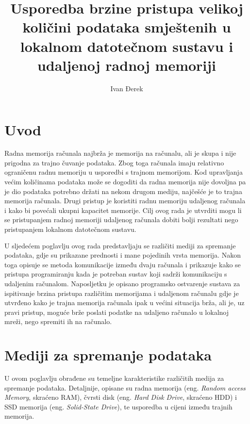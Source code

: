 \documentclass[times, utf8, zavrsni, square]{fer}
\begin{document}

\title{Usporedba brzine pristupa velikoj količini podataka smještenih u lokalnom datotečnom sustavu i udaljenoj radnoj memoriji}

\author{Ivan Đerek}

\maketitle




\zahvala{}

\tableofcontents

\chapter{Uvod}
Radna memorija računala najbrža je memorija na računalu, ali je skupa i nije prigodna za trajno čuvanje podataka.
Zbog toga računala imaju relativno ograničenu radnu memoriju u usporedbi s trajnom memorijom. 
Kod upravljanja većim količinama podataka može se dogoditi da radna memorija nije dovoljna pa je dio podataka potrebno držati na nekom drugom mediju,
najčešće je to trajna memorija računala. 
Drugi pristup je koristiti radnu memoriju udaljenog računala i kako bi povećali ukupni kapacitet memorije. 
Cilj ovog rada je utvrditi mogu li se pristupanjem radnoj memoriji udaljenog računala dobiti bolji rezultati nego pristupanjem lokalnom datotečnom sustavu.

U sljedećem poglavlju ovog rada predstavljaju se različiti mediji za spremanje podataka, gdje su prikazane prednosti i mane pojedinih vrsta memorija.
Nakon toga opisuje se metoda komunikacije između dvaju računala i prikazuje kako se pristupa programiranju kada je potreban sustav koji sadrži komunikaciju s udaljenim računalom.
Naposljetku je opisano programsko ostvarenje sustava za ispitivanje brzina pristupa različitim memorijama i udaljenom računalu gdje je utvrđeno kako je trajna memorija računala ipak u većini situacija brža,
ali je, uz pravi pristup, moguće brže poslati podatke na udaljeno računalo u lokalnoj mreži, nego spremiti ih na računalo.

\chapter{Mediji za spremanje podataka}
U ovom poglavlju obrađene su temeljne karakteristike različitih medija za spremanje podataka. 
Detaljnije, opisane su radna memorija (eng.\textit{ Random access Memory}, skraćeno RAM), čvrsti disk (eng.\textit{ Hard Disk Drive}, skraćeno HDD) i SSD memorija (eng.\textit{ Solid-State Drive}), te usporedba u cijeni između trajnih memorija.
\end{document}
